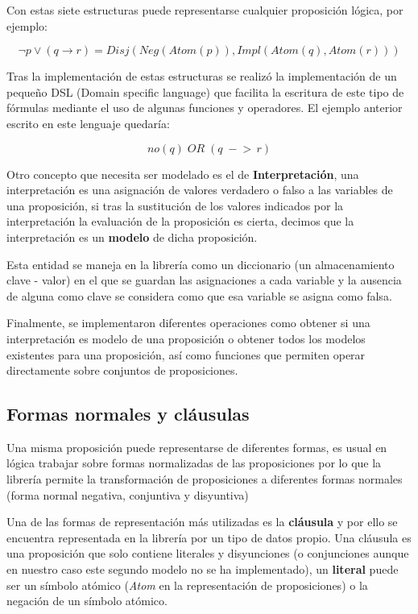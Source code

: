 	Con estas siete estructuras puede representarse cualquier proposición lógica, por ejemplo:
	
	\[
		\neg p \vee (q \rightarrow r) = Disj(Neg(Atom(p)), Impl(Atom(q), Atom(r)))
	\]
	
	Tras la implementación de estas estructuras se realizó la implementación de un pequeño DSL (Domain specific language) que facilita la escritura de este tipo de fórmulas mediante el uso de algunas funciones y operadores. El ejemplo anterior escrito en este lenguaje quedaría: 
	
	\[
		no(q) \; OR \; (q \; -\!\!> \, r) 
	\]
	
	Otro concepto que necesita ser modelado es el de \textbf{Interpretación}, una interpretación es una asignación de valores verdadero o falso a las variables de una proposición, si tras la sustitución de los valores indicados por la interpretación la evaluación de la proposición es cierta, decimos que la interpretación es un \textbf{modelo} de dicha proposición.
	
	Esta entidad se maneja en la librería como un diccionario (un almacenamiento clave - valor) en el que se guardan las asignaciones a cada variable y la ausencia de alguna como clave se considera como que esa variable se asigna como falsa.
	
	Finalmente, se implementaron diferentes operaciones como obtener si una interpretación es modelo de una proposición o obtener todos los modelos existentes para una proposición, así como funciones que permiten operar directamente sobre conjuntos de proposiciones.
	
	
	
\subsection*{Formas normales y cláusulas}

	Una misma proposición puede representarse de diferentes formas, es usual en lógica trabajar sobre formas normalizadas de las proposiciones por lo que la librería permite la transformación de proposiciones a diferentes formas normales (forma normal negativa, conjuntiva y disyuntiva)	
	
	Una de las formas de representación más utilizadas es la \textbf{cláusula} y por ello se encuentra representada en la librería por un tipo de datos propio. Una cláusula es una proposición que solo contiene literales y disyunciones (o conjunciones aunque en nuestro caso este segundo modelo no se ha implementado), un \textbf{literal} puede ser un símbolo atómico (\textit{Atom} en la representación de proposiciones) o la negación de un símbolo atómico.
	
